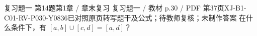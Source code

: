 \par\noindent\begin{minipage}{\linewidth}
\begin{bankitem}{复习题一 第14题}{第1章 / 章末复习 复习题一 / 教材 p.30 / PDF 第37页}{XJ-B1-C01-RV-P030-Y0836}{已对照原页转写题干及公式；待教师复核；未制作答案}
在什么条件下，有 $[a,b]\cup[c,d]=[a,d]$？
\end{bankitem}
\end{minipage}\par\medskip
